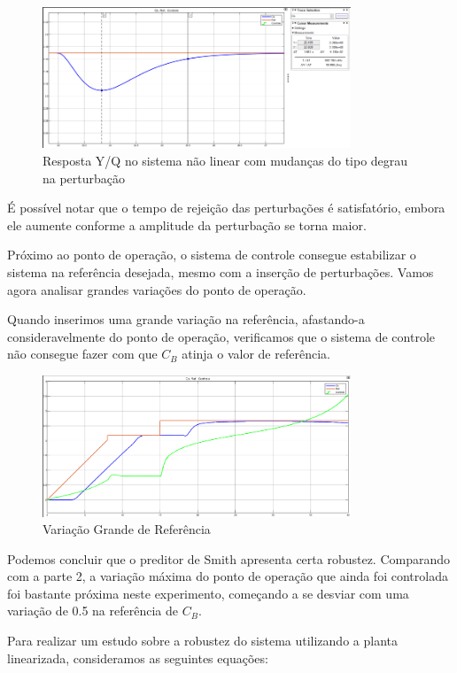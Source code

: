 \documentclass[a4paper,12pt]{article}
\begin{document}
\begin{figure}[H]
  \centering
  \includegraphics[width=0.82\textwidth]{figure7.png}
  \caption{Resposta Y/Q no sistema não linear com mudanças do tipo degrau na perturbação}
  \end{figure}

É possível notar que o tempo de rejeição das perturbações é satisfatório, embora ele aumente conforme a amplitude da perturbação se torna maior.

Próximo ao ponto de operação, o sistema de controle consegue estabilizar o sistema na referência desejada, mesmo com a inserção de perturbações. Vamos agora analisar grandes variações do ponto de operação.

Quando inserimos uma grande variação na referência, afastando-a consideravelmente do ponto de operação, verificamos que o sistema de controle não consegue fazer com que \(C_B\) atinja o valor de referência.

\begin{figure}[H]
  \centering
  \includegraphics[width=0.82\textwidth]{figure8.png}
  \caption{Variação Grande de Referência}
  \end{figure}

Podemos concluir que o preditor de Smith apresenta certa robustez. Comparando com a parte 2, a variação máxima do ponto de operação que ainda foi controlada foi bastante próxima neste experimento, começando a se desviar com uma variação de 0.5 na referência de \(C_B\).

Para realizar um estudo sobre a robustez do sistema utilizando a planta linearizada, consideramos as seguintes equações:
\end{document}
